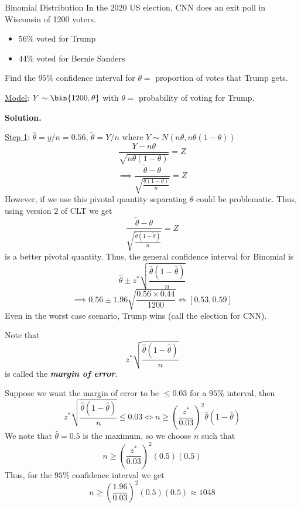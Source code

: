 \begin{Example}{Binomial Distribution}{}
    In the 2020 US election, CNN does an exit poll in Wisconsin of 1200 voters.
    \begin{itemize}
        \item $ 56\% $ voted for Trump
        \item $ 44\% $ voted for Bernie Sanders
    \end{itemize}
    Find the $ 95\% $ confidence interval for $ \theta= $ proportion of votes that
    Trump gets.

    \underline{Model}: $ Y \sim \bin{1200,\theta} $ with $ \theta= $ probability of
    voting for Trump.

    \textbf{Solution.}

    \underline{Step 1}: $ \hat{\theta}=y/n=0.56 $, $ \tilde{\theta}=Y/n $
    where $ Y \sim N(n\theta,n\theta(1-\theta)) $
    \[ \frac{Y-n\theta}{\sqrt{n\theta(1-\theta)}}=Z  \]
    \[ \implies \frac{\tilde{\theta}-\theta}{\sqrt{\frac{\theta(1-\theta)}{n}}}=Z  \]
    However, if we use this pivotal quantity separating $ \theta $ could be problematic.
    Thus, using version 2 of CLT we get
    \[ \frac{\tilde{\theta}-\theta}{\sqrt{\frac{\tilde{\theta}(1-\tilde{\theta})}{n}}}=Z \]
    is a better pivotal quantity.
    Thus, the general confidence interval for Binomial is
    \[ \hat{\theta}\pm z^*\sqrt{\frac{\hat{\theta}\left(1-\hat{\theta}\right)}{n} } \]
    \[ \implies 0.56\pm 1.96\sqrt{\frac{0.56\times 0.44}{1200}}\iff \left[ 0.53,0.59 \right] \]
    Even in the worst case scenario, Trump wins (call the election for CNN).

    Note that
    \[ z^*\sqrt{\frac{\hat{\theta}\left(1-\hat{\theta}\right)} {n}} \]
    is called the \textbf{\emph{margin of error}}.

    Suppose we want the margin of error to be $ \leqslant 0.03 $ for a $ 95\% $ interval, then
    \[ z^*\sqrt{\frac{\hat{\theta}\left(1-\hat{\theta}\right)}{n}}\leqslant 0.03\iff
        n\geqslant \left( \frac{z^*}{0.03}  \right)^2\hat{\theta}\left(1-\hat{\theta}\right) \]
    We note that $ \hat{\theta}=0.5 $ is the maximum, so we choose $ n $ such that
    \[ n\geqslant \left( \frac{z^*}{0.03}  \right)^2(0.5)(0.5) \]
    Thus, for the $ 95\% $ confidence interval we get
    \[ n\geqslant \left( \frac{1.96}{0.03} \right)^2(0.5)(0.5)\approx 1048 \]
\end{Example}

